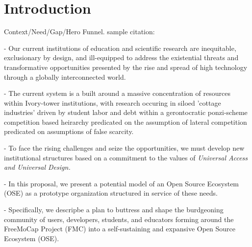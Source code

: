 \documentclass[11pt]{article}
\begin{document}
\pagestyle{empty} 
\setlength{\baselineskip}{12.6pt} 


\section{Introduction\label{sec:intro}}
 Context/Need/Gap/Hero Funnel. 
 sample citation: \cite{matthis_retinal_2022} 

- Our current institutions of education and scientific research are inequitable, exclusionary by design, and ill-equipped to address the existential threats and transformative opportunities presented by the rise and spread of high technology through a globally interconnected world. 

- The current system is a built around a massive concentration of resources within Ivory-tower institutions, with research occuring in siloed 'cottage industries' driven by student labor and debt within a gerontocratic ponzi-scheme competition based heirarchy predicated on the assumption of lateral competition predicated on assumptions of false scarcity. 

- To face the rising challenges and seize the opportunities, we must develop new institutional structures based on a commitment to the values of \it{Universal Access} and \it{Universal Design}. 


- In this proposal, we present a potential model of an Open Source Ecosystem (OSE) as a prototype organization structured in service of these needs. 

- Specifically, we descripbe a plan to buttress and shape the burdgeoning community of users, developers, students, and educators forming around the FreeMoCap Project (FMC) into a self-sustaining and expansive Open Source Ecosystem (OSE). 

\end{document}
